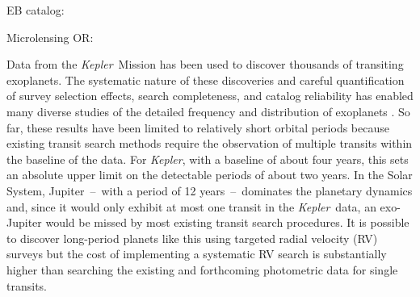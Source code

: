 \documentclass[manuscript, letterpaper]{aastex6}
\makeatletter
\let\origsection\section
\renewcommand\section{\@ifstar{\starsection}{\nostarsection}}
\newcommand\nostarsection[1]{\sectionprelude\origsection{#1}}
\newcommand\starsection[1]{\sectionprelude\origsection*{#1}}
\newcommand\sectionprelude{\vspace{1em}}
\newcommand{\project}[1]{\textsl{#1}}
\newcommand{\kepler}{\project{Kepler}}
\newcommand{\dd}{\ensuremath{\,\mathrm{d}}}
\makeatother
\begin{document}
\begin{abstract}

The \kepler\ Mission has discovered thousands of exoplanets and revolutionized
our understanding of their population.
This large, homogeneous catalog of discoveries has enabled rigorous studies of
the occurrence rate of exoplanets and extra-Solar planetary systems as a
function of their physical properties.
Transit survey like \kepler\ are most sensitive to planets with shorter
orbital periods than the gas giant planets that dominate the dynamics of our
Solar System.
We performed a fully-automated search for the transits of long-period
exoplanets in the archival \kepler\ light curves and announce XXX planet
candidates.
Since our method involves no human intervention, we empirically characterize
the completeness and reliability of our search.
Based on these results, we measure the average occurrence rate of exoplanets
smaller than Jupiter and with orbital periods longer than 700 days to be $\dd
N = YYY \pm ZZZ\dd \ln P \dd \ln R$.

\end{abstract}


\section{Introduction}

EB catalog: \citep{Kirk:2016}

Microlensing OR: \citep{Shvartzvald:2016}

Data from the \kepler\ Mission has been used to discover thousands of
transiting exoplanets.
The systematic nature of these discoveries and careful quantification of
survey selection effects, search completeness, and catalog reliability has
enabled many diverse studies of the detailed frequency and distribution of
exoplanets \citep[for example,][]{Howard:2012, Petigura:2013,
Foreman-Mackey:2014, Dressing:2015, Burke:2015, Mulders:2015}.
So far, these results have been limited to relatively short orbital periods
because existing transit search methods require the observation of multiple
transits within the baseline of the data.
For \kepler, with a baseline of about four years, this sets an absolute upper
limit on the detectable periods of about two years.
In the Solar System, Jupiter~--~with a period of 12 years~--~dominates the
planetary dynamics and, since it would only exhibit at most one transit in the
\kepler\ data, an exo-Jupiter would be missed by most existing transit search
procedures.
It is possible to discover long-period planets like this using targeted radial
velocity (RV) surveys \citep[for example][]{Butler:2006, Knutson:2014,
Bryan:2016} but the cost of implementing a systematic RV search is
substantially higher than searching the existing and forthcoming photometric
data for single transits.
\end{document}
